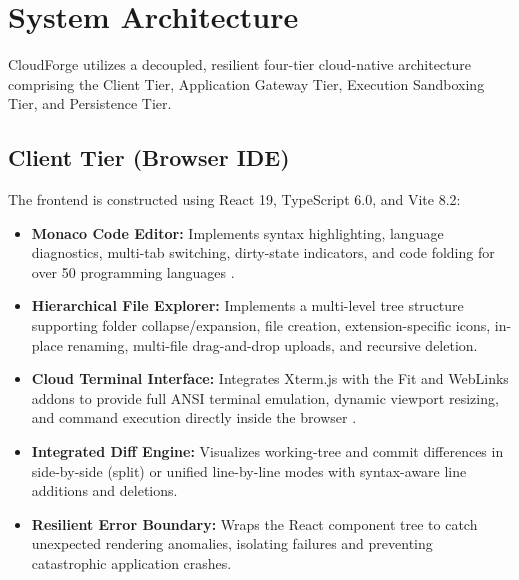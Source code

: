 \documentclass[conference]{IEEEtran}
\begin{document}
\section{System Architecture}

CloudForge utilizes a decoupled, resilient four-tier cloud-native architecture comprising the Client Tier, Application Gateway Tier, Execution Sandboxing Tier, and Persistence Tier.

\subsection{Client Tier (Browser IDE)}
The frontend is constructed using React 19, TypeScript 6.0, and Vite 8.2:
\begin{itemize}
    \item \textbf{Monaco Code Editor:} Implements syntax highlighting, language diagnostics, multi-tab switching, dirty-state indicators, and code folding for over 50 programming languages \cite{monaco}.
    \item \textbf{Hierarchical File Explorer:} Implements a multi-level tree structure supporting folder collapse/expansion, file creation, extension-specific icons, in-place renaming, multi-file drag-and-drop uploads, and recursive deletion.
    \item \textbf{Cloud Terminal Interface:} Integrates Xterm.js with the Fit and WebLinks addons to provide full ANSI terminal emulation, dynamic viewport resizing, and command execution directly inside the browser \cite{xterm}.
    \item \textbf{Integrated Diff Engine:} Visualizes working-tree and commit differences in side-by-side (split) or unified line-by-line modes with syntax-aware line additions and deletions.
    \item \textbf{Resilient Error Boundary:} Wraps the React component tree to catch unexpected rendering anomalies, isolating failures and preventing catastrophic application crashes.
\end{itemize}
\end{document}

